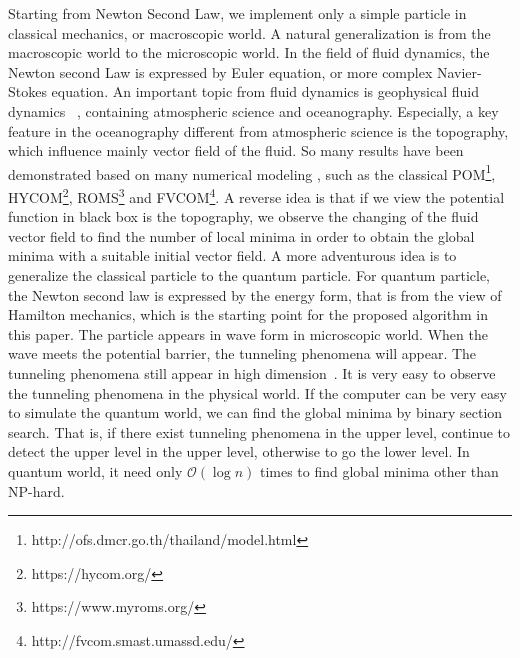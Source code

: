 \documentclass[11pt,fceqn]{article}
\numberwithin{equation}{section}
\theoremstyle{definition}
\begin{document}
Starting from Newton Second Law, we implement only a simple particle in classical mechanics, or macroscopic world. A natural generalization is from the macroscopic world to the microscopic world. In the field of fluid dynamics, the Newton second Law is expressed by Euler equation, or more complex Navier-Stokes equation. An important topic from fluid dynamics is geophysical fluid dynamics~\citep{pedlosky2013geophysical,cushman2011introduction} , containing atmospheric science and oceanography. Especially, a key feature in the oceanography different from atmospheric science is the topography, which influence mainly vector field of the fluid. So many results have been demonstrated based on many numerical modeling , such as the classical POM\footnote{ http://ofs.dmcr.go.th/thailand/model.html}, HYCOM\footnote{https://hycom.org/}, ROMS\footnote{https://www.myroms.org/} and FVCOM\footnote{http://fvcom.smast.umassd.edu/}. A reverse idea is that if we view the potential function in black box is the topography, we observe the changing of the fluid vector field to find the number of local minima in order to obtain the global minima with a suitable initial vector field.  A more adventurous idea is to generalize the classical particle to the quantum particle. For quantum particle, the Newton second law is expressed by the energy form, that is from the view of Hamilton mechanics, which is the starting point for the proposed algorithm in this paper.  The particle appears in wave form in microscopic world. When the wave meets the potential barrier, the tunneling phenomena will appear. The tunneling phenomena still appear in high dimension~\citep{nakamura2013quantum}. It is very easy to observe the tunneling phenomena in the physical world. If the computer can be very easy to simulate the quantum world, we can find the global minima by binary section search. That is, if there exist tunneling phenomena in the upper level, continue to detect the upper level in the upper level, otherwise to go the lower level. In quantum world, it need only $\mathcal{O}(\log n)$ times to find global minima other than NP-hard.
 






\newpage
\appendix
\end{document}
